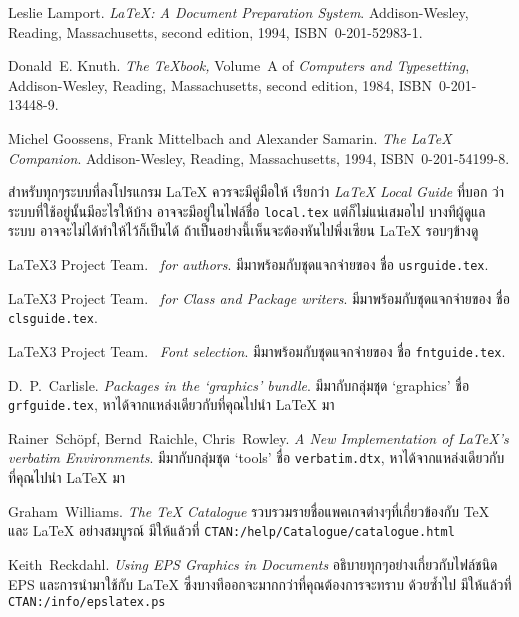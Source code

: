 \begin{thwbr}
\begin{thebibliography}{99}
 Leslie Lamport.  \newblock \emph{{\LaTeX:} A Document
    Preparation System}.  \newblock Addison-Wesley, Reading,
  Massachusetts, second edition, 1994, ISBN~0-201-52983-1.
  
 Donald~E. Knuth.  \newblock \textit{The \TeX{}book,}
  Volume~A of \textit{Computers and Typesetting}, Addison-Wesley,
  Reading, Massachusetts, second edition, 1984, ISBN~0-201-13448-9.

 Michel Goossens, Frank Mittelbach and Alexander
  Samarin.  \newblock \emph{The {\LaTeX} Companion}.  \newblock
  Addison-Wesley, Reading, Massachusetts, 1994, ISBN~0-201-54199-8.
 
 สำหรับทุกๆระบบที่ลงโปรแกรม \LaTeX{} ควรจะมีคู่มือให้ 
  เรียกว่า \emph{\LaTeX{} Local Guide} ที่บอก ว่าระบบที่ใช้อยู่นั้นมีอะไรให้บ้าง
  อาจจะมีอยู่ในไฟล์ชื่อ \texttt{local.tex} แต่ก็ไม่แน่เสมอไป บางทีผู้ดูแลระบบ
  อาจจะไม่ได้ทำให้ไว้ก็เป็นได้ ถ้าเป็นอย่างนี้เห็นจะต้องหันไปพึ่งเซียน \LaTeX{} 
  รอบๆข้างดู
 
 \LaTeX3 Project Team.  \newblock \emph{\LaTeXe~for
    authors}.  \newblock  มีมาพร้อมกับชุดแจกจ่ายของ \LaTeXe{} ชื่อ
  \texttt{usrguide.tex}.  

 \LaTeX3 Project Team.  \newblock \emph{\LaTeXe~for
    Class and Package writers}.  \newblock มีมาพร้อมกับชุดแจกจ่ายของ 
    \LaTeXe{} ชื่อ \texttt{clsguide.tex}.

 \LaTeX3 Project Team.  \newblock \emph{\LaTeXe~Font
    selection}.  \newblock มีมาพร้อมกับชุดแจกจ่ายของ \LaTeXe{} ชื่อ
    \texttt{fntguide.tex}.

 D.~P.~Carlisle.  \newblock \emph{Packages in the
    `graphics' bundle}.  \newblock มีมากับกลุ่มชุด `graphics' ชื่อ
  \texttt{grfguide.tex}, หาได้จากแหล่งเดียวกับที่คุณไปนำ \LaTeX{} มา

 Rainer~Sch\"opf, Bernd~Raichle, Chris~Rowley.  
\newblock \emph{A New Implementation of \LaTeX's verbatim
  Environments}.
 \newblock มีมากับกลุ่มชุด `tools' ชื่อ  \texttt{verbatim.dtx}, 
  หาได้จากแหล่งเดียวกับที่คุณไปนำ \LaTeX{} มา

 Graham~Williams.  \newblock \emph{The TeX
    Catalogue} รวบรวมรายชื่อแพคเกจต่างๆที่เกี่ยวข้องกับ \TeX{} และ 
    \LaTeX{} อย่างสมบูรณ์
  \newblock มีให้แล้วที่  \texttt{CTAN:/help/Catalogue/catalogue.html}
  
 Keith~Reckdahl.  \newblock \emph{Using EPS Graphics in
    \LaTeXe{} Documents} อธิบายทุกๆอย่างเกี่ยวกับไฟล์ชนิด EPS 
    และการนำมาใช้กับ \LaTeX{} ซึ่งบางทีออกจะมากกว่าที่คุณต้องการจะทราบ
    ด้วยซ้ำไป 
    \newblock มีให้แล้วที่ \texttt{CTAN:/info/epslatex.ps}
    

\end{thebibliography}
\end{thwbr}
